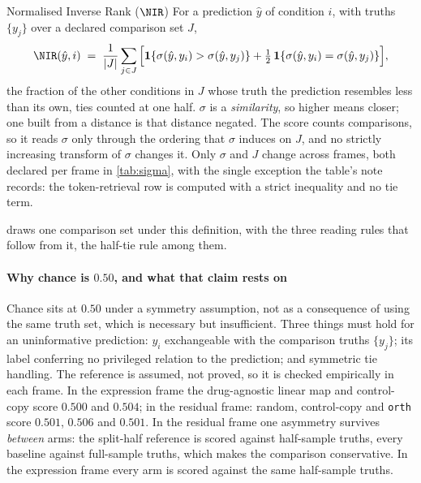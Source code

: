 \begin{defn}{Normalised Inverse Rank ($\NIR$)}
For a prediction $\hat y$ of condition $i$, with truths $\{y_j\}$ over a declared
comparison set $J$,
\begin{equation}
 \NIR(\hat{y}, i) \;=\; \frac{1}{|J|}\sum_{j \in J}
 \Big[\mathbf{1}\{\sigma(\hat{y}, y_i) > \sigma(\hat{y}, y_j)\}
 + \tfrac{1}{2}\,\mathbf{1}\{\sigma(\hat{y}, y_i) = \sigma(\hat{y}, y_j)\}\Big],
\end{equation}
the fraction of the other conditions in $J$ whose truth the prediction resembles
less than its own, ties counted at one half. $\sigma$ is a \emph{similarity}, so
higher means closer; one built from a distance is that distance negated. The
score counts comparisons, so it reads $\sigma$ only through the ordering that
$\sigma$ induces on $J$, and no strictly increasing transform of $\sigma$ changes
it. Only $\sigma$ and $J$ change across frames, both declared per frame in
\cref{tab:sigma}, with the single exception the table's note records: the
token-retrieval row is computed with a strict inequality and no tie term.
\end{defn}

 draws one comparison set under this definition, with the three
reading rules that follow from it, the half-tie rule among them.



\paragraph{Why chance is $0.50$, and what that claim rests on} Chance sits at
$0.50$ under a symmetry assumption, not as a consequence of using the same truth
set, which is necessary but insufficient. Three things must hold for an
uninformative prediction: $y_i$ exchangeable with the comparison truths
$\{y_j\}$; its label conferring no privileged relation to the prediction; and
symmetric tie handling. The reference is assumed, not proved, so it is checked
empirically in each frame. In the expression frame the drug-agnostic linear map
and control-copy score $0.500$ and $0.504$; in the residual frame: random,
control-copy and \texttt{orth} score $0.501$, $0.506$ and $0.501$. In the
residual frame one asymmetry survives \emph{between} arms: the split-half
reference is scored against half-sample truths, every baseline against
full-sample truths, which makes the comparison conservative. In the expression frame every
arm is scored against the same half-sample truths.

